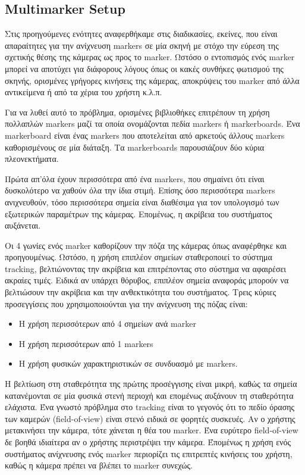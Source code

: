 \subsection{Multimarker Setup}




Στις προηγούμενες ενότητες αναφερθήκαμε στις διαδικασίες, εκείνες, που είναι απαραίτητες για την ανίχνευση markers σε μία σκηνή με στόχο την εύρεση της σχετικής θέσης της κάμερας ως προς το marker. Ωστόσο ο εντοπισμός ενός marker μπορεί να αποτύχει για διάφορους λόγους όπως οι κακές συνθήκες φωτισμού της σκηνής, ορισμένες γρήγορες κινήσεις της κάμερας, αποκρύψεις του marker από άλλα αντικείμενα ή από τα χέρια του χρήστη κ.λ.π. 



Για να λυθεί αυτό το πρόβλημα, ορισμένες βιβλιοθήκες επιτρέπουν τη χρήση πολλαπλών markers μαζί τα οποία ονομάζονται πεδία markers ή markerboards. Ένα markerboard είναι ένας markers που αποτελείται από αρκετούς άλλους markers καθορισμένους σε μία διάταξη. Τα markerboards παρουσιάζουν δύο κύρια πλεονεκτήματα. 

Πρώτα απ'όλα έχουν περισσότερα από ένα markers, που σημαίνει ότι είναι δυσκολότερο να χαθούν όλα την ίδια στιμή. Επίσης όσο περισσότερα markers ανιχνευθούν, τόσο περισσότερα σημεία είναι διαθέσιμα για τον υπολογισμό των εξωτερικών παραμέτρων της κάμερας.
Επομένως, η ακρίβεια του συστήματος αυξάνεται. 


Οι 4 γωνίες ενός marker καθορίζουν την πόζα της κάμερας όπως αναφέρθηκε και προηγουμένως. Ωστόσο, η χρήση επιπλέον σημείων σταθεροποιεί το σύστημα tracking, βελτιώνοντας την ακρίβεια και επιτρέποντας στο σύστημα να αφαιρέσει ακραίες τιμές. Ειδικά αν υπάρχει θόρυβος, επιπλέον σημεία αναφοράς μπορούν να βελτιώσουν την ακρίβεια και την ανθεκτικότητα του συστήματος. Τρεις κύριες προσεγγίσεις που χρησιμοποιούνται για την ανίχνευση της πόζας είναι:

\begin{itemize}
\item Η χρήση περισσότερων από 4 σημείων ανά marker
\item Η χρήση περισσότερων από 1 markers
\item Η χρήση φυσικών χαρακτηριστικών σε συνδυασμό με markers.
\end{itemize}


Η βελτίωση στη σταθερότητα της πρώτης προσέγγισης είναι μικρή, καθώς τα σημεία κατανέμονται σε μία φυσικά στενή περιοχή και επομένως αυξάνουν τη σταθερότητα ελάχιστα. Ένα γνωστό πρόβλημα στο tracking είναι το γεγονός ότι το πεδίο όρασης των καμερών (field-of-view) είναι στενό ειδικά σε φορητές συσκευές. Αν ο χρήστης μετακινήσει την κάμερα, τότε χάνεται η θέα του marker. Ένα ευρύτερο field-of-view δε βοηθά ιδιαίτερα αν ο χρήστης περιστρέψει την κάμερα. Έπομένως η χρήση ενός συστήματος ανίχνευσης ενός marker περιορίζει τις επιτρεπτές κινήσεις του χρήστη, καθώς η κάμερα πρέπει να βλέπει το marker συνεχώς.

